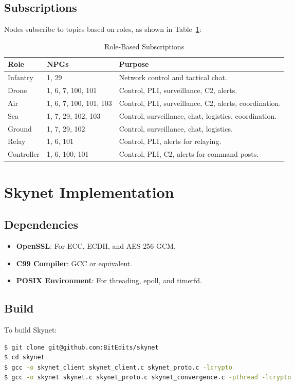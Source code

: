 \documentclass{article}
\begin{document}
\subsection{Subscriptions}
\label{subsec:subs}
Nodes subscribe to topics based on roles, as shown in Table~\ref{tab:subs}:
\begin{table}[h]
\centering
\caption{Role-Based Subscriptions}
\label{tab:subs}
\begin{tabular}{llp{7cm}}
\hline
\textbf{Role} & \textbf{NPGs} & \textbf{Purpose} \\
\hline
Infantry & 1, 29 & Network control and tactical chat. \\
Drone & 1, 6, 7, 100, 101 & Control, PLI, surveillance, C2, alerts. \\
Air & 1, 6, 7, 100, 101, 103 & Control, PLI, surveillance, C2, alerts, coordination. \\
Sea & 1, 7, 29, 102, 103 & Control, surveillance, chat, logistics, coordination. \\
Ground & 1, 7, 29, 102 & Control, surveillance, chat, logistics. \\
Relay & 1, 6, 101 & Control, PLI, alerts for relaying. \\
Controller & 1, 6, 100, 101 & Control, PLI, C2, alerts for command posts. \\
\hline
\end{tabular}
\end{table}

\section{Skynet Implementation}

\subsection{Dependencies}
\begin{itemize}
    \item \textbf{OpenSSL}: For ECC, ECDH, and AES-256-GCM.
    \item \textbf{C99 Compiler}: GCC or equivalent.
    \item \textbf{POSIX Environment}: For threading, epoll, and timerfd.
\end{itemize}

\subsection{Build}
To build Skynet:
\begin{lstlisting}[language=bash]
$ git clone git@github.com:BitEdits/skynet
$ cd skynet
$ gcc -o skynet_client skynet_client.c skynet_proto.c -lcrypto
$ gcc -o skynet skynet.c skynet_proto.c skynet_convergence.c -pthread -lcrypto
\end{lstlisting}
\end{document}
